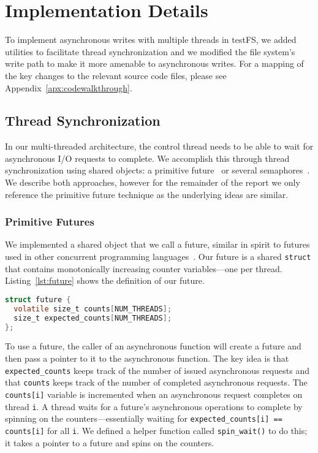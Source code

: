 \section{Implementation Details}
To implement asynchronous writes with multiple threads in testFS, we added
utilities to facilitate thread synchronization and we modified the file
system's write path to make it more amenable to asynchronous writes. For a
mapping of the key changes to the relevant source code files, please see
Appendix~\ref{apx:codewalkthrough}.

\subsection{Thread Synchronization}\label{sec:threadsync}
In our multi-threaded architecture, the control thread needs to be able to wait
for asynchronous I/O requests to complete. We accomplish this through thread
synchronization using shared objects: a primitive
future~\cite{futures-halstead85} or several
semaphores~\cite{semaphores-dijkstra65}. We describe both approaches, however
for the remainder of the report we only reference the primitive future
technique as the underlying ideas are similar.

\subsubsection{Primitive Futures}\label{sec:futures}
We implemented a shared object that we call a future, similar in spirit to
futures used in other concurrent programming
languages~\cite{futures-halstead85}. Our future is a shared {\tt struct} that
contains monotonically increasing counter variables---one per thread.
Listing~\ref{lst:future} shows the definition of our future.

\begin{lstlisting}[language=C,
  caption={The definition of our future.},
  captionpos=b,
  label={lst:future}]
struct future {
  volatile size_t counts[NUM_THREADS];
  size_t expected_counts[NUM_THREADS];
};
\end{lstlisting}

To use a future, the caller of an asynchronous function will create a future
and then pass a pointer to it to the asynchronous function. The key idea is
that {\tt expected\_counts} keeps track of the number of issued asynchronous
requests and that {\tt counts} keeps track of the number of completed
asynchronous requests. The {\tt counts[i]} variable is incremented when an
asynchronous request completes on thread {\tt i}. A thread waits for a future's
asynchronous operations to complete by spinning on the counters---essentially
waiting for {\tt expected\_counts[i] == counts[i]} for all {\tt i}. We defined
a helper function called {\tt spin\_wait()} to do this; it takes a pointer to a
future and spins on the counters.


